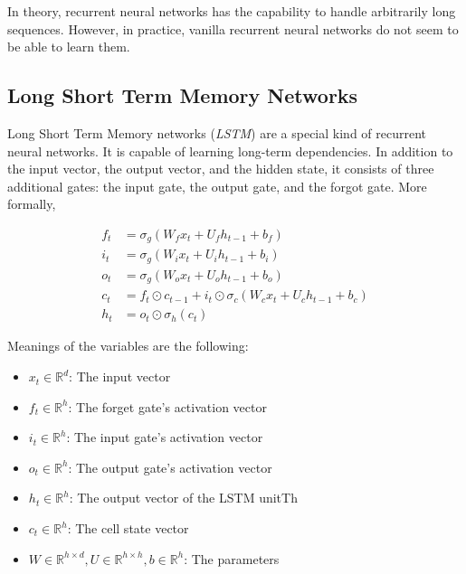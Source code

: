         In theory, recurrent neural networks has the capability to handle arbitrarily long sequences.
        However, in practice, vanilla recurrent neural networks do not seem to be able to learn them.
        \cite{Pascanu2013}

    \subsection{Long Short Term Memory Networks}

        Long Short Term Memory networks (\emph{LSTM}) are a special kind of recurrent neural networks.
        It is capable of learning long-term dependencies.
        In addition to the input vector, the output vector, and the hidden state,
        it consists of three additional gates: the input gate, the output gate, and the forgot gate.
        More formally, 

        \begin{align*}
            f_t &= \sigma_g(W_fx_t + U_fh_{t-1} + b_f) \\
            i_t &= \sigma_g(W_ix_t + U_ih_{t-1} + b_i) \\
            o_t &= \sigma_g(W_ox_t + U_oh_{t-1} + b_o) \\
            c_t &= f_t \odot c_{t-1} + i_t \odot \sigma_c(W_cx_t + U_ch_{t-1} + b_c) \\
            h_t &= o_t \odot \sigma_h(c_t)
        \end{align*}

        Meanings of the variables are the following:

        \begin{itemize}
            \item $x_t \in \mathbb{R}^d$: The input vector
            \item $f_t \in \mathbb{R}^h$: The forget gate's activation vector
            \item $i_t \in \mathbb{R}^h$: The input gate's activation vector
            \item $o_t \in \mathbb{R}^h$: The output gate's activation vector
            \item $h_t \in \mathbb{R}^h$: The output vector of the LSTM unitTh
            \item $c_t \in \mathbb{R}^h$: The cell state vector
            \item $W \in \mathbb{R}^{h \times d}, U \in \mathbb{R}^{h \times h}, b \in \mathbb{R}^{h}$: 
                The parameters
        \end{itemize}


